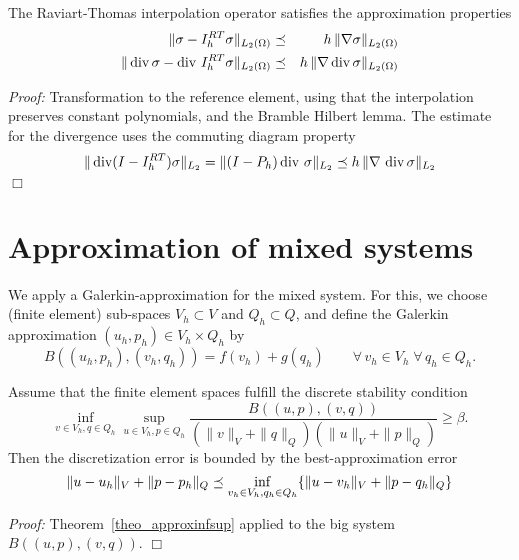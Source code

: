 \begin{theorem} The Raviart-Thomas interpolation operator satisfies
the approximation properties
\begin{eqnarray*}
\| \sigma - I_h^{RT} \sigma \|_{L_2(\Omega)} & \preceq &
         h \, \| \nabla \sigma \|_{L_2(\Omega)} \\
\| \operatorname{div} \sigma - \operatorname{div} \, I_h^{RT} \sigma \|_{L_2(\Omega)} & \preceq &
         h \, \| \nabla \operatorname{div} \sigma \|_{L_2(\Omega)} \\
\end{eqnarray*}
\end{theorem}
{\em Proof:} Transformation to the reference element, using that the 
interpolation preserves constant polynomials, and the Bramble Hilbert lemma.
The estimate for the divergence uses the commuting diagram property
$$
\| \operatorname{div} (I - I_h^{RT}) \sigma \|_{L_2} = \| (I-P_h) \operatorname{div} \, \sigma \|_{L_2}
\preceq h \, \| \nabla \, \operatorname{div} \sigma \|_{L_2}
$$
\hfill $\Box$
\section{Approximation of mixed systems}
We apply a Galerkin-approximation for the mixed system. For this,
we choose (finite element) sub-spaces $V_h \subset V$ and $Q_h \subset Q$, 
and define the Galerkin approximation $(u_h, p_h) \in V_h \times Q_h$ by
$$
B( (u_h, p_h), (v_h, q_h) ) = f(v_h) + g(q_h) \qquad \forall \, v_h \in V_h 
\; \forall \, q_h \in Q_h.
$$
\begin{theorem}
Assume that the finite element spaces fulfill the discrete stability
condition
\begin{equation}\label{equ_discreteinfsup}
\inf_{v \in V_h, q \in Q_h } \sup_{u \in V_h, p \in Q_h} \frac{B((u,p),(v,q))}{ ( \|v\|_V+\|q\|_Q) (\|u\|_V+\|p\|_Q)} \geq \beta.
\end{equation}
Then the discretization error is bounded by the best-approximation error
$$
\| u - u_h \|_V + \| p - p_h \|_Q \preceq \inf_{v_h \in V_h, q_h \in Q_h}
        \{ \| u - v_h \|_V + \| p - q_h \|_Q \}
$$
\end{theorem}
{\em Proof:} Theorem~\ref{theo_approxinfsup} applied to the big system $B((u,p),(v,q))$. \hfill $\Box$

\bigskip


